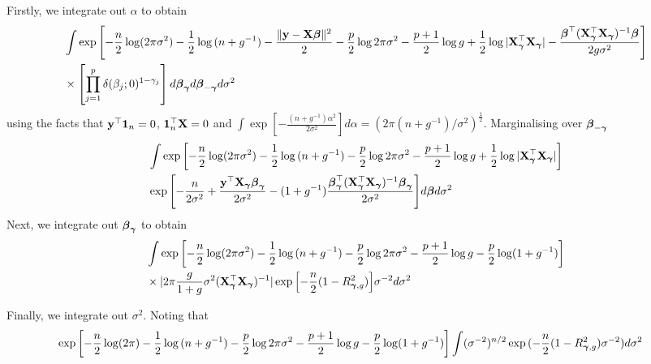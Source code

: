 \documentclass{amsart}[12pt]
\theoremstyle{definition}
\begin{document}
\noindent Firstly, we integrate out $\alpha$ to obtain
\begin{align*}
		&  \int \exp{\left[-\frac{n}{2} \log (2 \pi \sigma^2) - \frac{1}{2} \log{(n + g^{-1})}  - \frac{\|{\bf y}- {\bf X}{\boldsymbol\beta}\|^2}{2} 
		-\frac{p}{2} \log{2\pi \sigma^2} - \frac{p + 1}{2} \log{g} + \frac{1}{2} \log{|{\bf X}_{\boldsymbol\gamma}^\top {\bf X}_{\boldsymbol\gamma}|} - \frac{{\boldsymbol\beta}^\top ({\bf X}_{\boldsymbol\gamma}^\top {\bf X}_{\boldsymbol\gamma})^{-1} {\boldsymbol\beta}}{2 g \sigma^{2}} \right]} \\
		&\times \left[ \prod_{j=1}^p \delta(\beta_j; 0)^{1 - \gamma_j} \right] d {\boldsymbol \beta}_{{\boldsymbol \gamma}} d {\boldsymbol \beta}_{-{\boldsymbol \gamma}} d \sigma^2
\end{align*}
using the facts that ${\bf y}^\top {\bf1}_n = 0$, ${\bf 1}_n^\top {\bf X} = 0$ and $\int \exp{\left[-\frac{(n + g^{-1})\alpha^2}{2 \sigma^{2}} \right]} d \alpha = (2 \pi (n + g^{-1}) / \sigma^{2})^{\frac{1}{2}}$.
Marginalising over ${\boldsymbol \beta}_{-{\boldsymbol \gamma}}$
\begin{align*}
		& \int \exp{\left[-\frac{n}{2} \log (2 \pi \sigma^2) - \frac{1}{2} \log{(n + g^{-1})}
		-\frac{p}{2} \log{2\pi \sigma^2} - \frac{p + 1}{2} \log{g}
		+ \frac{1}{2} \log{|{\bf X}_{\boldsymbol\gamma}^\top {\bf X}_{\boldsymbol\gamma}|} \right]} \\
		&\exp{\left[- \frac{n}{2 \sigma^2}+ \frac{{\bf y}^\top{\bf X}_{\boldsymbol\gamma}{\boldsymbol\beta}_{\boldsymbol\gamma}}{2 \sigma^2} - (1 + g^{-1})\frac{{\boldsymbol\beta}_{\boldsymbol\gamma}^\top ({\bf X}_{\boldsymbol\gamma}^\top {\bf X}_{\boldsymbol\gamma})^{-1} {\boldsymbol\beta}_{\boldsymbol\gamma}}{2 \sigma^{2}} \right]} d {\boldsymbol \beta} d \sigma^2
\end{align*}
\noindent Next, we integrate out ${\boldsymbol \beta}_{{\boldsymbol \gamma}}$ to obtain
\begin{align*}
		& \int \exp{\left[-\frac{n}{2} \log (2 \pi \sigma^2) - \frac{1}{2} \log{(n + g^{-1})}
		-\frac{p}{2} \log{2\pi \sigma^2} - \frac{p + 1}{2} \log{g} - \frac{p}{2} \log (1 + g^{-1}) \right]} \\
		&\times |2 \pi \frac{g}{1 + g} \sigma^2 ({\bf X}_{\boldsymbol \gamma}^\top {\bf X}_{\boldsymbol \gamma})^{-1}| \exp{\left[-\frac{n}{2} (1 - R^2_{{\boldsymbol\gamma}, g})\right]} \sigma^{-2}
		d \sigma^2
\end{align*}

\noindent Finally, we integrate out $\sigma^2$. Noting that
\begin{align*}
		& \exp{\left[-\frac{n}{2} \log (2 \pi) - \frac{1}{2} \log{(n + g^{-1})}
		-\frac{p}{2} \log{2\pi \sigma^2} - \frac{p + 1}{2} \log{g} - \frac{p}{2} \log (1 + g^{-1}) \right]}
		 \int (\sigma^{-2})^{n/2} \exp{(-\frac{n}{2} (1 - R^2_{{\boldsymbol\gamma}, g}) \sigma^{-2})} d \sigma^2
\end{align*}



\end{document}
